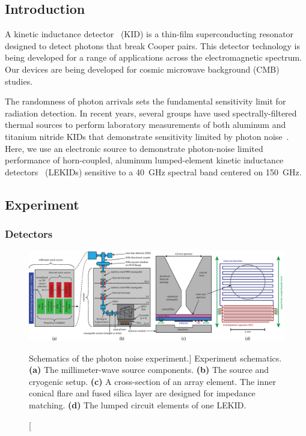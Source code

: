 \subsection{Introduction}

A kinetic inductance detector~\autocite{Day2003Nature} (KID) is a thin-film superconducting resonator designed to detect photons that break Cooper pairs.
This detector technology is being developed for a range of applications across the electromagnetic spectrum.
Our devices are being developed for cosmic microwave background (CMB) studies.

The randomness of photon arrivals sets the fundamental sensitivity limit for radiation detection.
In recent years, several groups have used spectrally-filtered thermal sources to perform laboratory measurements of both aluminum and titanium nitride KIDs that demonstrate sensitivity limited by photon noise~\autocite{Yates2011APL,Janssen2013APL,Mauskopf2014JLTP,deVisser2014NatComm,Hubmayr2015APL}.
Here, we use an electronic source to demonstrate photon-noise limited performance of horn-coupled, aluminum lumped-element kinetic inductance detectors~\autocite{Doyle2010SPIE} (LEKIDs) sensitive to a \SI{40}{GHz} spectral band centered on \SI{150}{GHz}.


\subsection{Experiment}

\subsubsection{Detectors}

\begin{figure}[htb]
\centering
\includegraphics[width=\textwidth]{sensitivity/experiment.eps}
\caption
[Schematics of the photon noise experiment.]
{
Experiment schematics.
\textbf{(a)} The millimeter-wave source components.
\textbf{(b)} The source and cryogenic setup.
\textbf{(c)} A cross-section of an array element. The inner conical flare and fused silica layer are designed for impedance matching.
\textbf{(d)} The lumped circuit elements of one LEKID.
}
\label{fig:measuring.experiment}
\end{figure}

